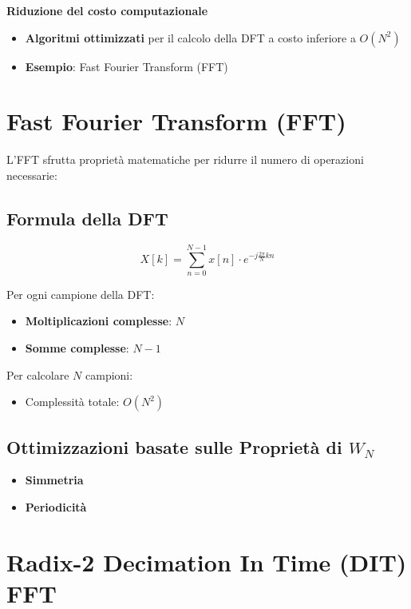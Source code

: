 \textbf{Riduzione del costo computazionale}

\begin{itemize}
    \item \textbf{Algoritmi ottimizzati} per il calcolo della DFT a costo inferiore a \( O(N^2) \)
    \item \textbf{Esempio}: Fast Fourier Transform (FFT)
\end{itemize}


\section{Fast Fourier Transform (FFT)}

L'FFT sfrutta proprietà matematiche per ridurre il numero di operazioni necessarie:

\subsection{Formula della DFT}
\[
X[k] = \sum_{n=0}^{N-1} x[n] \cdot e^{-j \frac{2\pi}{N} k n}
\]

Per ogni campione della DFT:
\begin{itemize}
    \item \textbf{Moltiplicazioni complesse}: \( N \)
    \item \textbf{Somme complesse}: \( N-1 \)
\end{itemize}

Per calcolare \( N \) campioni:
\begin{itemize}
    \item Complessità totale: \( O(N^2) \) \quad {}
\end{itemize}

\subsection{\texorpdfstring{Ottimizzazioni basate sulle Proprietà di \( W_N \)}{Ottimizzazioni basate sulle Proprietà di W\_N}}


\begin{itemize}
    \item \textbf{Simmetria}
    \item \textbf{Periodicità}
\end{itemize}

\section{Radix-2 Decimation In Time (DIT) FFT}

